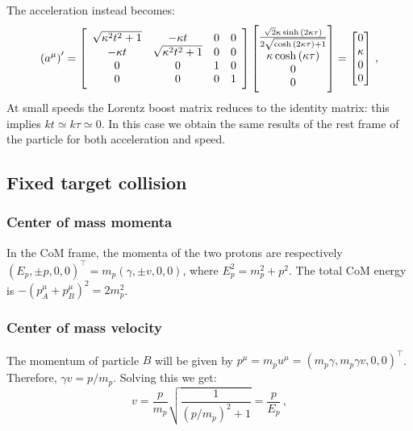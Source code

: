 \documentclass[main.tex]{subfiles}
\begin{document}
The acceleration instead becomes:
%
\begin{equation}
  \qty(a^{\mu})' =
  \left[\begin{array}{cccc}
    \sqrt{\kappa^2 t^2 + 1}  & -\kappa t  & 0 & 0 \\ 
    -\kappa t  & \sqrt{\kappa^2 t^2 + 1}  & 0 & 0 \\ 
    0 & 0 & 1 & 0 \\ 
    0 & 0 & 0 & 1
    \end{array}\right]
    \begin{bmatrix}
      \frac{\sqrt{2} \kappa \sinh{\left(2 \kappa \tau \right)}}{2 \sqrt{\cosh{\left(2 \kappa \tau \right)} + 1}}
      \\
      \kappa \cosh \left(\kappa \tau \right)\\
      0 \\
      0
    \end{bmatrix}
  = 
  \begin{bmatrix}
  0 \\
  \kappa  \\
  0 \\
  0
  \end{bmatrix}
\,,
\end{equation}
%
At small speeds the Lorentz boost matrix reduces to the identity matrix: this implies $kt\simeq k\tau\simeq 0$. In this case we obtain the same results of the rest frame of the particle for both acceleration and speed.
\subsection{Fixed target collision}

\subsubsection{Center of mass momenta}

In the CoM frame, the momenta of the two protons are respectively \((E_p, \pm p, 0,0)^\top = m_p (\gamma, \pm v, 0, 0)\), where \(E_p^2 = m_p^2 + p^2\).
The total CoM energy is \(-(p^\mu _A + p^\mu _B )^2 = 2 m_p^2\).

\subsubsection{Center of mass velocity}

The momentum of particle \(B\) will be given by \(p^{\mu } = m_p u^{\mu } = (m_p \gamma , m_p \gamma v, 0, 0)^\top\). Therefore, \(\gamma v = p / m_p\). Solving this we get: 
%
\begin{equation}
  v = \frac{p}{m_p} \sqrt{\frac{1}{(p/m_p)^{2} + 1}} = \frac{p}{E_p}
\,,
\end{equation}
%
\end{document}

